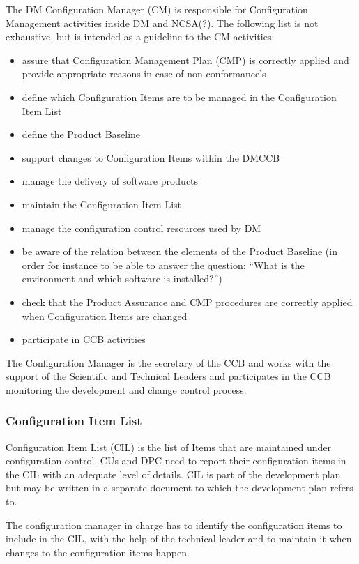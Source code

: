 The DM Configuration Manager (CM) is responsible 
for Configuration Management activities inside DM and NCSA(?).
The following list is not exhaustive, but is intended as a guideline to the CM activities:
\begin{itemize}
	\item assure that Configuration Management Plan (CMP) is correctly applied and provide appropriate reasons in case of non conformance's 
 \item define which Configuration Items are to be managed in the Configuration Item List
 \item define the Product Baseline
 \item support changes to Configuration Items within the DMCCB
 \item manage the delivery of software products
 \item maintain the Configuration Item List
 \item manage the configuration control resources used by DM
 \item be aware of the relation between  the elements of the Product Baseline (in order for instance to be able to answer the question: ``What is the environment and which software is installed?'')
 \item check that the Product Assurance  and CMP procedures are correctly applied when Configuration Items are changed
 \item participate in CCB activities
\end{itemize}

The Configuration Manager is the secretary of the CCB and 
works with the support of the Scientific and Technical Leaders 
and participates in the CCB monitoring the development 
and change control process.



\subsubsection{Configuration Item List}
Configuration Item List (CIL) is the list of Items that are maintained under configuration control.
CUs and DPC need to report their configuration items in the CIL with an adequate level of details.
CIL is part of the development plan but may be written 
in a separate document to which the development plan refers to.

The configuration manager in charge has to identify the configuration items to include in the CIL, 
with the help of the technical leader and to maintain it when changes to the configuration items happen.


